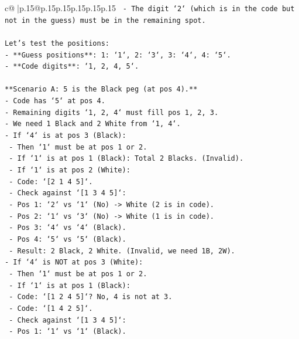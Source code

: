 \documentclass{article}
\begin{document}
{\begin{supertabular}{c@{$\;$}|p{.15\linewidth}@{}p{.15\linewidth}p{.15\linewidth}p{.15\linewidth}p{.15\linewidth}p{.15\linewidth}}
{{{\texttt{    {-} The digit `2` (which is in the code but not in the guess) must be in the remaining spot.} \\
\\ 
\texttt{Let's test the positions:} \\
\texttt{{-} **Guess positions**: 1: `1`, 2: `3`, 3: `4`, 4: `5`.} \\
\texttt{{-} **Code digits**: `1, 2, 4, 5`.} \\
\\ 
\texttt{**Scenario A: 5 is the Black peg (at pos 4).**} \\
\texttt{{-} Code has `5` at pos 4.} \\
\texttt{{-} Remaining digits `1, 2, 4` must fill pos 1, 2, 3.} \\
\texttt{{-} We need 1 Black and 2 White from `1, 4`.} \\
\texttt{{-} If `4` is at pos 3 (Black):} \\
\texttt{    {-} Then `1` must be at pos 1 or 2.} \\
\texttt{    {-} If `1` is at pos 1 (Black): Total 2 Blacks. (Invalid).} \\
\texttt{    {-} If `1` is at pos 2 (White):} \\
\texttt{        {-} Code: `{[}2 1 4 5{]}`.} \\
\texttt{        {-} Check against `{[}1 3 4 5{]}`:} \\
\texttt{            {-} Pos 1: `2` vs `1` (No) {-}> White (2 is in code).} \\
\texttt{            {-} Pos 2: `1` vs `3` (No) {-}> White (1 is in code).} \\
\texttt{            {-} Pos 3: `4` vs `4` (Black).} \\
\texttt{            {-} Pos 4: `5` vs `5` (Black).} \\
\texttt{            {-} Result: 2 Black, 2 White. (Invalid, we need 1B, 2W).} \\
\texttt{{-} If `4` is NOT at pos 3 (White):} \\
\texttt{    {-} Then `1` must be at pos 1 or 2.} \\
\texttt{    {-} If `1` is at pos 1 (Black):} \\
\texttt{        {-} Code: `{[}1 2 4 5{]}`? No, 4 is not at 3.} \\
\texttt{        {-} Code: `{[}1 4 2 5{]}`.} \\
\texttt{        {-} Check against `{[}1 3 4 5{]}`:} \\
\texttt{            {-} Pos 1: `1` vs `1` (Black).} \\
}}}
\end{supertabular}}
\end{document}

